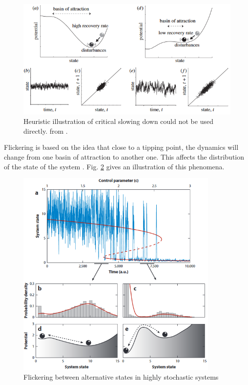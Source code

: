 \documentclass{article}
\begin{document}
\begin{figure}[h]
\begin{center}
\includegraphics[width=12cm]{slowing_down.png}
\end{center}
\caption{\label{fig:temp}Heuristic illustration of critical slowing down could not be used directly. from \cite{lenton_early_2012}.
\label{fig:csd}
}
\end{figure}

Flickering is based on the idea that close to a tipping point, the dynamics will change from one basin of attraction to another one. This affects the distribution of the state of the system \citep{carr_modeling_2012, wang_flickering_2012, dakos_flickering_2013, scheffer_anticipating_2012}. Fig. \ref{fig:flick} gives an illustration of this phenomena.


\begin{figure}[h]
\begin{center}
\includegraphics[width=10cm]{flickering.png}
\end{center}
\caption{\label{fig:temp}Flickering between alternative states in highly stochastic systems \citep{scheffer_anticipating_2012}}
\label{fig:flick}
\end{figure}
\end{document}
